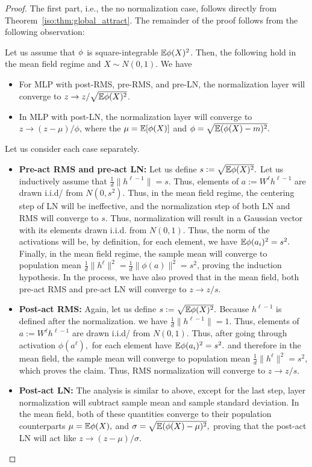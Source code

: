 \begin{proof}
The first part, i.e., the no normalization case, follows directly from Theorem~\ref{iso:thm:global_attract}. The remainder of the proof follows from the following observation:

Let us assume that $\phi$ is square-integrable $\mathbb{E} \phi(X)^2$. Then, the following hold in the mean field regime and $X\sim N(0,1).$ We have 
\begin{itemize}
    \item For MLP with post-RMS, pre-RMS, and pre-LN, the normalization layer will converge to  $z\to z/\sqrt{\mathbb{E} \phi(X)^2}$.
    \item In MLP with post-LN, the normalization layer will converge to $z \to  (z-\mu)/\phi$, where the $\mu = \mathbb{E}[\phi(X)]$ and $\phi = \sqrt{\mathbb{E} (\phi(X) - m)^2 }.$ 
\end{itemize}

Let us consider each case separately.

\begin{itemize}
    \item \textbf{Pre-act RMS and pre-act LN:} 
 Let us define $s:= \sqrt{\mathbb{E} \phi(X)^2}.$ Let us inductively assume that $\frac1d \|h^{\ell-1}\| = s.$ Thus, elements of $a:= W^\ell h^{\ell-1}$ are drawn i.i.d/ from $N(0,s^2).$ Thus, in the mean field regime, the centering step of LN will be ineffective, and the normalization step of both LN and RMS will converge to $s.$ Thus, normalization will result in a Gaussian vector with its elements drawn i.i.d. from $N(0,1).$ Thus, the norm of the activations will be, by definition, for each element, we have $\mathbb{E} \phi(a_i)^2 = s^2.$ Finally, in the mean field regime, the sample mean will converge to population mean $\frac1d\|h^\ell\|^2 = \frac1d\|\phi(a)\|^2 = s^2 $, proving the induction hypothesis. In the process, we have also proved that in the mean field, both pre-act RMS and pre-act LN will converge to $z\to z/ s.$

\item \textbf{Post-act RMS:} Again, let us define $s:= \sqrt{\mathbb{E} \phi(X)^2}.$ Because $h^{\ell-1}$ is defined after the normalization. we have $\frac1d \|h^{\ell-1}\| = 1.$ Thus, elements of $a:= W^\ell h^{\ell-1}$ are drawn i.i.d/ from $N(0,1).$ Thus, after going through activation $\phi(a^\ell),$ for each element have $\mathbb{E} \phi(a_i)^2 = s^2.$ and therefore in the mean field, the sample mean will converge to population mean $\frac1d\|h^\ell\|^2 = s^2 $, which proves the claim. Thus, RMS normalization will converge to $z \to z/ s.$
    \item \textbf{Post-act LN:} The analysis is similar to above, except for the last step, layer normalization will subtract sample mean and sample standard deviation. In the mean field, both of these quantities converge to their population counterparts $\mu = \mathbb{E} \phi(X),$ and $\sigma = \sqrt{\mathbb{E} (\phi(X) - \mu)^2 },$ proving that the post-act LN will act like $z \to  (z-\mu)/\sigma.$ 
\end{itemize}


\end{proof}
